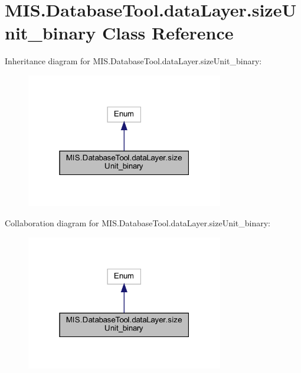 \hypertarget{classMIS_1_1DatabaseTool_1_1dataLayer_1_1sizeUnit__binary}{}\section{M\+I\+S.\+Database\+Tool.\+data\+Layer.\+size\+Unit\+\_\+binary Class Reference}
\label{classMIS_1_1DatabaseTool_1_1dataLayer_1_1sizeUnit__binary}


Inheritance diagram for M\+I\+S.\+Database\+Tool.\+data\+Layer.\+size\+Unit\+\_\+binary\+:\nopagebreak
\begin{figure}[H]
\begin{center}
\leavevmode
\includegraphics[width=244pt]{classMIS_1_1DatabaseTool_1_1dataLayer_1_1sizeUnit__binary__inherit__graph}
\end{center}
\end{figure}


Collaboration diagram for M\+I\+S.\+Database\+Tool.\+data\+Layer.\+size\+Unit\+\_\+binary\+:\nopagebreak
\begin{figure}[H]
\begin{center}
\leavevmode
\includegraphics[width=244pt]{classMIS_1_1DatabaseTool_1_1dataLayer_1_1sizeUnit__binary__coll__graph}
\end{center}
\end{figure}
